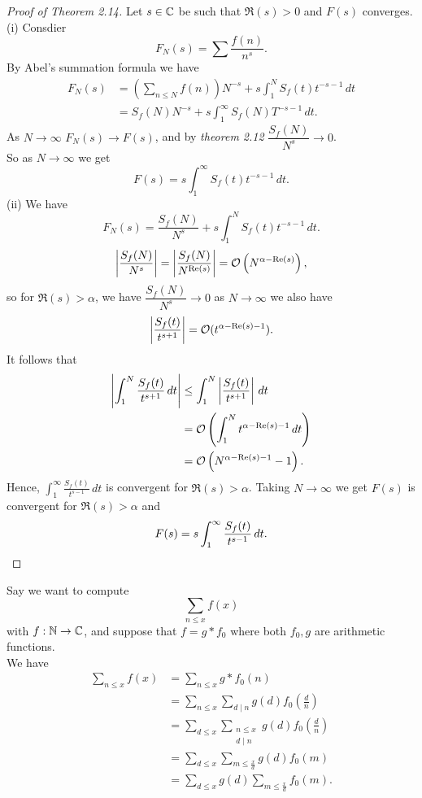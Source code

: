\documentclass[twoside, openright, fontsize=10pt, headings=big]{scrbook}
\begin{document}
\begin{proof}[Proof of Theorem 2.14]
    Let $s\in\mathbb{C}$ be such that $\Re(s)>0$ and $F(s)$ converges.\\
    (i) Consdier 
    \[
        F_N(s)=\sum\frac{f(n)}{n^s}.
    \]
    By Abel's summation formula we have
    \begin{align*}
        F_N(s)&=\left(\sum_{n\leq N}f(n)\right)N^{-s}+s\int_{1}^{N}S_f(t)t^{-s-1}\,dt\\
        &=S_f(N)N^{-s}+s\int_{1}^{\infty}S_f(N)T^{-s-1}\,dt.
    \end{align*}
    As $N\to\infty$ $F_N(s)\to F(s)$, and by \textit{theorem 2.12} $\dfrac{S_f(N)}{N^s}\to0$.\\
    So as $N\to\infty$ we get
    \[
        F(s)=s\int_{1}^{\infty}S_f(t)t^{-s-1}\,dt.
    \]
    (ii) We have
    \[
        F_N(s)=\frac{S_f(N)}{N^s}+s\int_{1}^{N}S_f(t)t^{-s-1}\,dt.
    \]
    \[
        \left|\frac{S_f(N)}{N^s}\right|=\left|\frac{S_f(N)}{N^{\Re(s)}}\right|=\mathcal{O}\left(N^{\alpha-\Re(s)}\right),
    \]
    so for $\Re(s)>\alpha$, we have $\dfrac{S_f(N)}{N^s}\to 0$ as $N\to\infty$ we also have 
    \[
        \left|\frac{S_f(t)}{t^{s+1}}\right|=\mathcal{O}(t^{\alpha-\Re(s)-1}).
    \]
    It follows that
    \begin{align*}
        \left|\int_{1}^{N}\frac{S_f(t)}{t^{s+1}}\,dt\right|&\leq\int_{1}^{N}\left|\frac{S_f(t)}{t^{s+1}}\right|\,dt\\
        &=\mathcal{O}\left(\int_{1}^{N}t^{\alpha-\Re(s)-1}\,dt\right)\\
        &=\mathcal{O}\left(N^{\alpha-\Re(s)-1}-1\right).
    \end{align*}
    Hence, $\int_{1}^{\infty}\frac{S_f(t)}{t^{s-1}}\,dt$ is convergent for $\Re(s)>\alpha$. Taking $N\to\infty$ we get $F(s)$ is convergent for $\Re(s)>\alpha$ and 
    \[
        F(s)=s\int_{1}^{\infty}\frac{S_f(t)}{t^{s-1}}\,dt.\qedhere
    \]
\end{proof}
Say we want to compute
\[
    \sum_{n\leq x}f(x)
\]
with $f:\mathbb{N}\to\mathbb{C}$, and suppose that $f=g\ast f_0$ where both $f_0,g$ are arithmetic functions.\\
We have
\begin{align*}
    \sum_{n\leq x}f(x)&=\sum_{n\leq x}g\ast f_0(n)\\
    &=\sum_{n\leq x}\sum_{d\mid n}g(d)f_0\left(\frac{d}{n}\right)\\
    &=\sum_{d\leq x}\sum_{\substack{n\leq x\\d\mid n}}g(d)f_0\left(\frac{d}{n}\right)\\
    &=\sum_{d\leq x}\sum_{m\leq \frac{x}{d}}g(d)f_0\left(m\right)\\
    &=\sum_{d\leq x}g(d)\sum_{m\leq \frac{x}{d}}f_0\left(m\right).
\end{align*}
\end{document}
